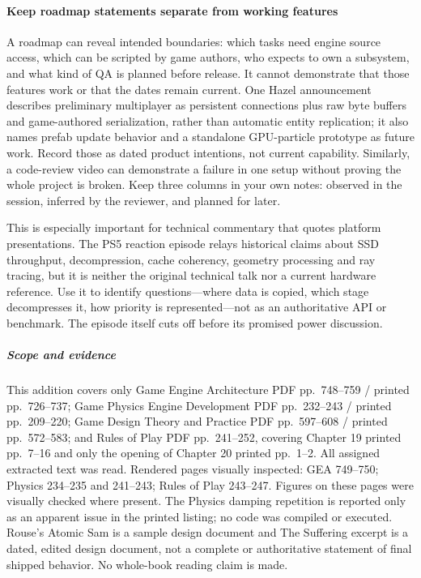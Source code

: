 \paragraph{Keep roadmap statements separate from working features}\label{06-engine-ii-ch041-keep-roadmap-statements-separate-from-working-features}

\hypertarget{06-engine-ii-ch041-keep-roadmap-statements-separate-from-working-features}{}

A roadmap can reveal intended boundaries: which tasks need engine source access, which can be scripted by game authors, who expects to own a subsystem, and what kind of QA is planned before release. It cannot demonstrate that those features work or that the dates remain current. One Hazel announcement describes preliminary multiplayer as persistent connections plus raw byte buffers and game-authored serialization, rather than automatic entity replication; it also names prefab update behavior and a standalone GPU-particle prototype as future work. Record those as dated product intentions, not current capability. Similarly, a code-review video can demonstrate a failure in one setup without proving the whole project is broken. Keep three columns in your own notes: observed in the session, inferred by the reviewer, and planned for later.

This is especially important for technical commentary that quotes platform presentations. The PS5 reaction episode relays historical claims about SSD throughput, decompression, cache coherency, geometry processing and ray tracing, but it is neither the original technical talk nor a current hardware reference. Use it to identify questions---where data is copied, which stage decompresses it, how priority is represented---not as an authoritative API or benchmark. The episode itself cuts off before its promised power discussion.

\subparagraph{Scope and evidence}\label{06-engine-ii-ch041-scope-and-evidence}

\hypertarget{06-engine-ii-ch041-scope-and-evidence}{}

This addition covers only Game Engine Architecture PDF pp.~748--759 / printed pp.~726--737; Game Physics Engine Development PDF pp.~232--243 / printed pp.~209--220; Game Design Theory and Practice PDF pp.~597--608 / printed pp.~572--583; and Rules of Play PDF pp.~241--252, covering Chapter 19 printed pp.~7--16 and only the opening of Chapter 20 printed pp.~1--2. All assigned extracted text was read. Rendered pages visually inspected: GEA 749--750; Physics 234--235 and 241--243; Rules of Play 243--247. Figures on these pages were visually checked where present. The Physics damping repetition is reported only as an apparent issue in the printed listing; no code was compiled or executed. Rouse's Atomic Sam is a sample design document and The Suffering excerpt is a dated, edited design document, not a complete or authoritative statement of final shipped behavior. No whole-book reading claim is made.

